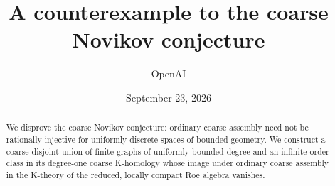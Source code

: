 \documentclass[11pt]{article}
\title{A counterexample to the coarse Novikov conjecture}
\author{OpenAI}
\date{September 23, 2026}
\theoremstyle{remark}\newtheorem{remark}[theorem]{Remark}
\begin{document}
\maketitle
\begin{abstract}
We disprove the coarse Novikov conjecture: ordinary coarse assembly need not
be rationally injective for uniformly discrete spaces of bounded geometry.
We construct a coarse disjoint union of finite graphs of uniformly bounded
degree and an infinite-order class in its degree-one coarse K-homology whose
image under ordinary coarse assembly in the K-theory of the reduced, locally
compact Roe algebra vanishes.
\end{abstract}
\tableofcontents
\clearpage






\clearpage
{}
{}


\end{document}
